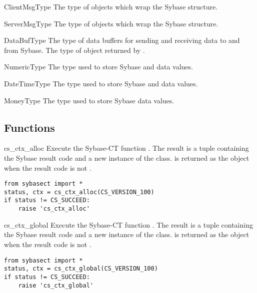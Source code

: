 \begin{datadesc}{ClientMsgType}
The type of  objects which wrap the Sybase
 structure.
\end{datadesc}

\begin{datadesc}{ServerMsgType}
The type of  objects which wrap the Sybase
 structure.
\end{datadesc}

\begin{datadesc}{DataBufType}
The type of data buffers for sending and receiving data to and from
Sybase.  The type of object returned by .
\end{datadesc}

\begin{datadesc}{NumericType}
The type used to store Sybase  and 
data values.
\end{datadesc}

\begin{datadesc}{DateTimeType}
The type used to store Sybase  and
 data values.
\end{datadesc}

\begin{datadesc}{MoneyType}
The type used to store Sybase  data values.
\end{datadesc}

\subsection{Functions}

\begin{funcdesc}{cs_ctx_alloc}{}
Execute the Sybase-CT function .  The result
is a tuple containing the Sybase result code and a new instance of the
 class.   is returned as the
 object when the result code is not
.

\begin{verbatim}
from sybasect import *
status, ctx = cs_ctx_alloc(CS_VERSION_100)
if status != CS_SUCCEED:
    raise 'cs_ctx_alloc'
\end{verbatim}
\end{funcdesc}

\begin{funcdesc}{cs_ctx_global}{}
Execute the Sybase-CT function .  The result
is a tuple containing the Sybase result code and a new instance of the
 class.   is returned as the
 object when the result code is not
.

\begin{verbatim}
from sybasect import *
status, ctx = cs_ctx_global(CS_VERSION_100)
if status != CS_SUCCEED:
    raise 'cs_ctx_global'
\end{verbatim}
\end{funcdesc}

